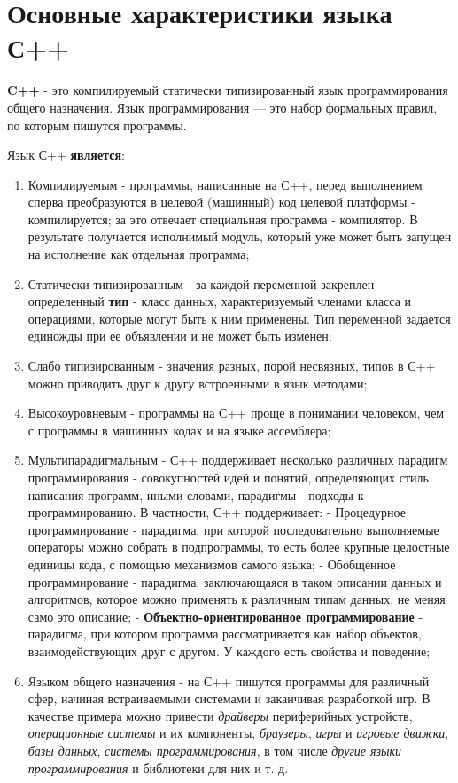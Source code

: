 \section{Основные характеристики языка С++}

\textbf{C++} - это компилируемый статически типизированный язык
программирования общего назначения. Язык программирования --- это набор
формальных правил, по которым пишутся программы.

Язык С++ \textbf{является}:
\begin{enumerate}
    \item Компилируемым - программы, написанные на
        С++, перед выполнением сперва преобразуются в целевой (машинный) код
        целевой платформы - компилируется; за это отвечает специальная программа
        - компилятор. В результате получается исполнимый модуль, который уже
    может быть запущен на исполнение как отдельная программа; 
    \item Статически
    типизированным - за каждой переменной закреплен определенный
    \textbf{тип} - класс данных, характеризуемый членами класса и
    операциями, которые могут быть к ним применены. Тип переменной задается
    единожды при ее объявлении и не может быть изменен;
    \item Слабо типизированным - значения разных, порой несвязных, типов в С++ можно
    приводить друг к другу встроенными в язык методами;
    \item Высокоуровневым -
    программы на С++ проще в понимании человеком, чем с программы в машинных
    кодах и на языке ассемблера; \item Мультипарадигмальным - С++ поддерживает
    несколько различных парадигм программирования - совокупностей идей и
    понятий, определяющих стиль написания программ, иными словами, парадигмы
    - подходы к программированию. В частности, С++ поддерживает: -
    Процедурное программирование - парадигма, при которой последовательно
    выполняемые операторы можно собрать в подпрограммы, то есть более
    крупные целостные единицы кода, с помощью механизмов самого языка; -
    Обобщенное программирование - парадигма, заключающаяся в таком описании
    данных и алгоритмов, которое можно применять к различным типам данных,
    не меняя само это описание; - \textbf{Объектно-ориентированное
    программирование} - парадигма, при котором программа рассматривается как
    набор объектов, взаимодействующих друг с другом. У каждого есть свойства
    и поведение;
    \item Языком общего назначения - на С++ пишутся программы для
    различный сфер, начиная встраиваемыми системами и заканчивая разработкой
    игр. В качестве примера можно привести \emph{драйверы} периферийных
    устройств, \emph{операционные системы} и их компоненты, \emph{браузеры},
    \emph{игры} и \emph{игровые движки}, \emph{базы данных}, \emph{системы
    программирования}, в том числе \emph{другие языки программирования} и
    библиотеки для них и т. д.
\end{enumerate}
    
